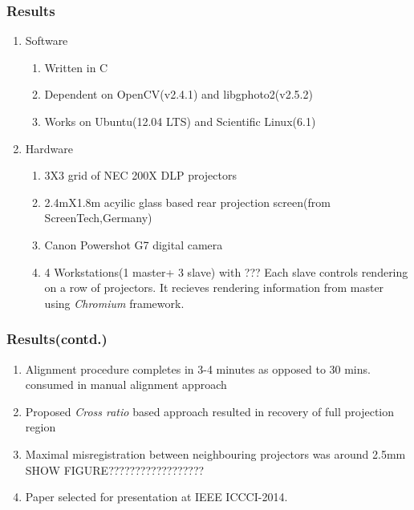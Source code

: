 \documentclass{beamer}
\begin{document}

\begin{frame}
\frametitle{Results}
\begin{enumerate}
\item Software
\begin{enumerate}
\item Written in C
\item Dependent on OpenCV(v2.4.1) and libgphoto2(v2.5.2)
\item Works on Ubuntu(12.04 LTS) and Scientific Linux(6.1)
\end{enumerate}      
\item Hardware
\begin{enumerate}
\item 3X3 grid of NEC 200X DLP projectors
\item 2.4mX1.8m acyilic glass based rear projection screen(from ScreenTech,Germany)
\item Canon Powershot G7 digital camera
\item 4 Workstations(1 master+ 3 slave) with ???\newline
Each slave controls rendering on a row of projectors. It recieves rendering information from master using \textit{Chromium} framework.
\end{enumerate}
\end{enumerate}
\end{frame}


\begin{frame}
\frametitle{Results(contd.)}
\begin{enumerate}
\item Alignment procedure completes in 3-4 minutes as opposed to 30 mins. consumed in manual alignment approach
\item Proposed \textit{Cross ratio} based approach resulted in recovery of full projection region
\item Maximal misregistration between neighbouring projectors was around 2.5mm
SHOW FIGURE??????????????????
\item Paper selected for presentation at IEEE ICCCI-2014.
\end{enumerate}
\end{frame}
\end{document}
